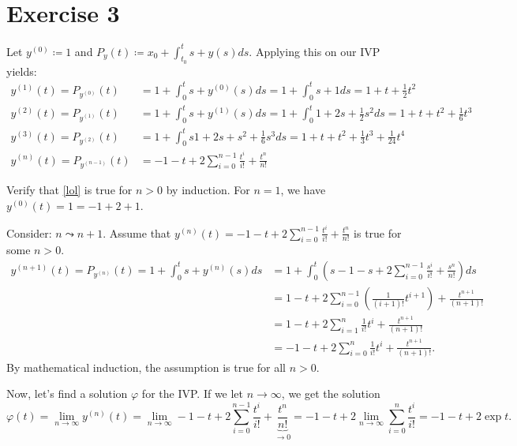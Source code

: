 \documentclass{article}
\theoremstyle{named}
\begin{document}
	\section*{Exercise 3}
	Let $y^{(0)} \coloneqq 1$ and $P_y(t) \coloneqq x_0 + \int^t_{t_0} s+ y(s) ds$. Applying this on our IVP yields:
	\begin{align*}
	y^{(1)}(t) = P_{y^{(0)}}(t) &= 1 + \int^t_0 s + y^{(0)}(s) ds = 1 + \int^t_0 s + 1 ds = 1 + t + \frac{1}{2}t^2 \\
	y^{(2)}(t) = P_{y^{(1)}}(t) &= 1 + \int^t_0 s + y^{(1)}(s) ds = 1 + \int^t_0 1 + 2s + \frac{1}{2}s^2 ds = 1 + t + t^2 + \frac{1}{6}t^3 \\
	y^{(3)}(t) = P_{y^{(2)}}(t) &= 1 + \int^t_0 s  1 + 2s + s^2 + \frac{1}{6}s^3 ds = 1 + t + t^2 + \frac{1}{3}t^3 + \frac{1}{24}t^4 \\
	y^{(n)}(t) = P_{y^{(n-1)}}(t) &= -1 - t + 2\sum^{n-1}_{i=0}\frac{t^i}{i!} + \frac{t^n}{n!}  \tag{$\star$} \label{lol}
	\end{align*}
	
	Verify that \eqref{lol} is true for $n>0$ by induction. For $n=1$, we have $ y^{(0)}(t) = 1 = -1 + 2 + 1$. 
	
	Consider: $n \leadsto n+1$. Assume that $y^{(n)}(t) = -1 - t + 2\sum^{n-1}_{i=0}\frac{t^i}{i!} + \frac{t^n}{n!} $ is true for some $n > 0$.
	\begin{align*}
	y^{(n+1)}(t) = P_{y^{(n)}}(t) = 1 + \int^t_0 s + y^{(n)}(s)ds &= 1 + \int^t_0 \left( s -1 - s + 2\sum^{n-1}_{i=0}\frac{s^i}{i!} + \frac{s^n}{n!} \right)ds \\
	&= 1 - t + 2\sum^{n-1}_{i=0}(\frac{1}{(i+1)!}t^{i+1}) + \frac{t^{n+1}}{(n+1)!} \\
	&= 1 - t + 2\sum^{n}_{i=1}\frac{1}{i!}t^{i} + \frac{t^{n+1}}{(n+1)!} \\
	&= -1 - t + 2\sum^{n}_{i=0}\frac{1}{i!}t^{i} + \frac{t^{n+1}}{(n+1)!}.
	\end{align*}
	By mathematical induction, the assumption is true for all $n>0$.
	
	Now, let's find a solution $\varphi$ for the IVP. If we let $n \to \infty$, we get the solution 
	\[
	\varphi(t) = \lim_{n \to \infty} y^{(n)}(t) = \lim_{n \to \infty} -1 - t + 2\sum^{n-1}_{i=0}\frac{t^i}{i!} + \underbrace{\frac{t^n}{n!}}_{\to 0} =  -1 - t +2 \lim_{n \to \infty} \sum^{n}_{i=0}\frac{t^i}{i!} = -1 - t +2\exp t.
	\]
	
\end{document}
